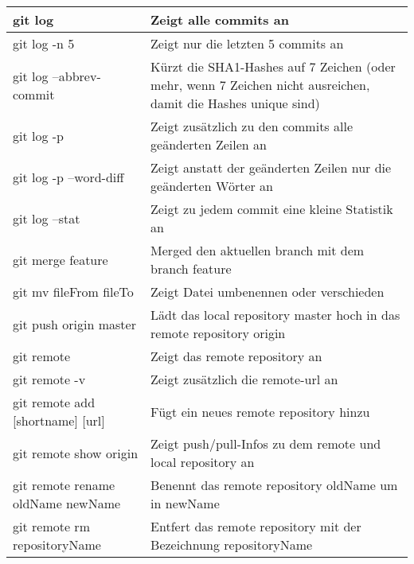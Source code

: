 \begin{longtable}{|p{7cm}|p{8cm}|}
		  	\rowcolor{tablerowcolor_cyan}
		  	git log & Zeigt alle commits an
		  	\\ \hline
		  	\rowcolor{tablerowcolor_cyan}
		  	git log -n 5 & Zeigt nur die letzten 5 commits an
		  	\\ \hline
		  	\rowcolor{tablerowcolor_cyan}
		  	git log --abbrev-commit & Kürzt die SHA1-Hashes auf 7 Zeichen (oder mehr, wenn 7 Zeichen nicht ausreichen, damit die Hashes unique sind)
		  	\\ \hline
		  	\rowcolor{tablerowcolor_cyan}
		  	git log -p & Zeigt zusätzlich zu den commits alle geänderten Zeilen an
		  	\\ \hline
		  	\rowcolor{tablerowcolor_cyan}
		  	git log -p --word-diff & Zeigt anstatt der geänderten Zeilen nur die geänderten Wörter an
		  	\\ \hline
		  	\rowcolor{tablerowcolor_cyan}
		  	git log --stat & Zeigt zu jedem commit eine kleine Statistik an
		  	\\ \hline


		  	\rowcolor{tablerowcolor_orange}
		  	git merge feature & Merged den aktuellen branch mit dem branch feature
		  	\\ \hline


		  	\rowcolor{tablerowcolor_cyan}
		  	git mv fileFrom fileTo & Zeigt Datei umbenennen oder verschieden
		  	\\ \hline


		  	\rowcolor{tablerowcolor_orange}
		  	git push origin master & Lädt das local repository master hoch in das remote repository origin
		  	\\ \hline


		  	\rowcolor{tablerowcolor_cyan}
		  	git remote & Zeigt das remote repository an
		  	\\ \hline
		  	\rowcolor{tablerowcolor_cyan}
		  	git remote -v & Zeigt zusätzlich die remote-url an
		  	\\ \hline
		  	\rowcolor{tablerowcolor_cyan}
		  	git remote add [shortname] [url] & Fügt ein neues remote repository hinzu
		  	\\ \hline
		  	\rowcolor{tablerowcolor_cyan}
		  	git remote show origin & Zeigt push/pull-Infos zu dem remote und local repository an
		  	\\ \hline
		  	\rowcolor{tablerowcolor_cyan}
		  	git remote rename oldName newName & Benennt das remote repository oldName um in newName
		  	\\ \hline
		  	\rowcolor{tablerowcolor_cyan}
		  	git remote rm repositoryName & Entfert das remote repository mit der Bezeichnung repositoryName
		  	\\ \hline



\end{longtable}
